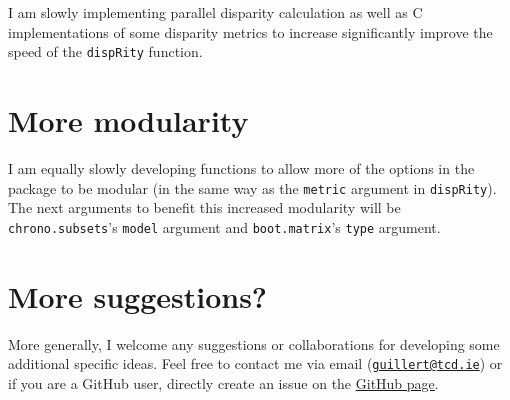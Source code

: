 \documentclass[]{book}
\theoremstyle{definition}
\theoremstyle{definition}
\theoremstyle{remark}
\begin{document}
I am slowly implementing parallel disparity calculation as well as C
implementations of some disparity metrics to increase significantly
improve the speed of the \texttt{dispRity} function.

\section{More modularity}\label{more-modularity}

I am equally slowly developing functions to allow more of the options in
the package to be modular (in the same way as the \texttt{metric}
argument in \texttt{dispRity}). The next arguments to benefit this
increased modularity will be \texttt{chrono.subsets}'s \texttt{model}
argument and \texttt{boot.matrix}'s \texttt{type} argument.

\section{More suggestions?}\label{more-suggestions}

More generally, I welcome any suggestions or collaborations for
developing some additional specific ideas. Feel free to contact me via
email (\href{mailto:guillert@tcd.ie}{\nolinkurl{guillert@tcd.ie}}) or if
you are a GitHub user, directly create an issue on the
\href{https://github.com/TGuillerme/dispRity}{GitHub page}.


\end{document}
